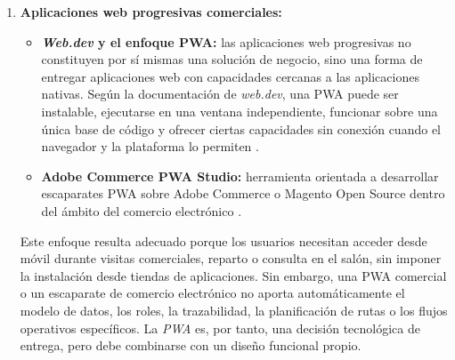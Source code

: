 \begin{enumerate}[label=\textbf{\arabic*.}, leftmargin=1.1cm, itemsep=0.6em, topsep=0.35em]
  Estas aplicaciones son relevantes porque se dirigen al mismo entorno profesional de peluquerías y salones. Sin embargo, su usuario principal es el propio salón, no el distribuidor de productos. Su núcleo funcional se centra en reservas, agenda, caja y relación entre salón y cliente final. Por ello, no cubren de forma natural la gestión de rutas comerciales del distribuidor, el pedido de producto profesional entre empresas, el reparto físico, la relación comercial con múltiples peluquerías o la coordinación con sistemas de facturación externos.

  \item \textbf{Aplicaciones web progresivas comerciales:}
  \begin{itemize}[topsep=0.1em, itemsep=0.15em]
    \item \textbf{\textit{Web.dev} y el enfoque PWA:} las aplicaciones web progresivas no constituyen por sí mismas una solución de negocio, sino una forma de entregar aplicaciones web con capacidades cercanas a las aplicaciones nativas. Según la documentación de \textit{web.dev}, una PWA puede ser instalable, ejecutarse en una ventana independiente, funcionar sobre una única base de código y ofrecer ciertas capacidades sin conexión cuando el navegador y la plataforma lo permiten \citep{webdev-pwa}.
    \item \textbf{Adobe Commerce PWA Studio:} herramienta orientada a desarrollar escaparates PWA sobre Adobe Commerce o Magento Open Source dentro del ámbito del comercio electrónico \citep{adobe-pwa-studio}.
  \end{itemize}

  Este enfoque resulta adecuado porque los usuarios necesitan acceder desde móvil durante visitas comerciales, reparto o consulta en el salón, sin imponer la instalación desde tiendas de aplicaciones. Sin embargo, una PWA comercial o un escaparate de comercio electrónico no aporta automáticamente el modelo de datos, los roles, la trazabilidad, la planificación de rutas o los flujos operativos específicos. La \textit{PWA} es, por tanto, una decisión tecnológica de entrega, pero debe combinarse con un diseño funcional propio.


\end{enumerate}
